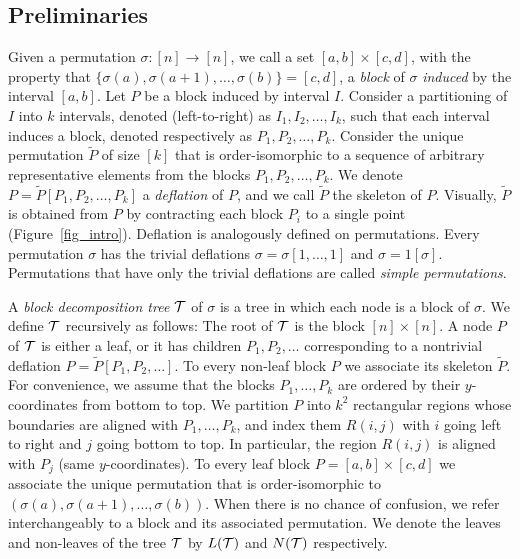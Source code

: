 \subsection{Preliminaries}
\label{subsec:decomp}
Given a permutation $\sigma: [n] \rightarrow [n]$, we call a set $[a,b] \times [c,d]$, with the property that $\{\sigma(a), \sigma(a+1), \dots, \sigma(b)\} = [c,d]$, a \emph{block} of $\sigma$ %
\emph{induced} by the interval $[a,b]$. 
Let $P$ be a block induced by interval $I$. Consider a partitioning of $I$ into $k$ intervals, denoted (left-to-right) as $I_1, I_2, \dots, I_k$, such that each interval induces a block, denoted respectively as $P_1, P_2, \dots, P_k$. Consider the unique permutation $\tilde{P}$ of size $[k]$ that is order-isomorphic to a sequence of arbitrary representative elements from the blocks $P_1, P_2, \dots, P_k$. We denote $P = \tilde{P}[P_1, P_2, \dots, P_k]$ a \emph{deflation} of $P$, and we call $\tilde{P}$ the skeleton of $P$. Visually, $\tilde{P}$ is obtained from $P$ by contracting each block $P_i$ to a single point (Figure~\ref{fig_intro}). Deflation is analogously defined on permutations. Every permutation $\sigma$ has the trivial deflations $\sigma = \sigma[1, \dots, 1]$ and $\sigma=1[\sigma]$. Permutations that have only the trivial deflations are called \emph{simple permutations}.



A \emph{block decomposition tree} ${\mathcal T}$ of $\sigma$ is a tree in which each node is a block of $\sigma$. We define ${\mathcal T}$ recursively as follows: The root of ${\mathcal T}$ is the block $[n] \times [n]$. A node $P$ of ${\mathcal T}$ is either a leaf, or it has children $P_1, P_2, \dots$ corresponding to a nontrivial deflation $P = \tilde{P}[P_1, P_2, \dots ]$. To every non-leaf block $P$ we associate its skeleton $\tilde{P}$. For convenience, we assume that the blocks $P_1,\ldots, P_k$ are ordered by their $y$-coordinates from bottom to top. We partition $P$ into $k^2$ rectangular regions whose boundaries are aligned with $P_1, \ldots, P_k$, and index them $R(i,j)$ with $i$ going left to right and $j$ going bottom to top. In particular, the region $R(i,j)$ is aligned with $P_j$ (same $y$-coordinates). 
To every leaf block $P = [a,b] \times [c,d]$ we associate the unique permutation that is order-isomorphic to $(\sigma(a), \sigma(a+1), \dots, \sigma(b))$. When there is no chance of confusion, we refer interchangeably to a block and its associated permutation. We denote the leaves and non-leaves of the tree ${\mathcal T}$ by $L({\mathcal T})$ and $N({\mathcal T})$ respectively.


